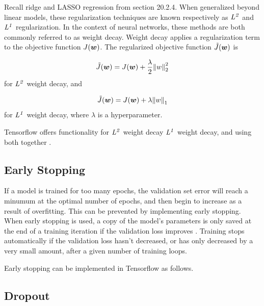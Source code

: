 \documentclass{article}
\begin{document}
Recall ridge and LASSO regression from section 20.2.4. When generalized beyond linear models, these regularization techniques are known respectively as \(\it{L}^2\) and \(\it{L}^1\) regularization. In the context of neural networks, these methods are both commonly referred to as weight decay. Weight decay applies a regularization term to the objective function \(J(\vb*{w})\). The regularized objective function \(\tilde{J}(\vb*{w})\) is 

\begin{equation}
    \tilde{J}(\vb*{w}) = J(\vb*{w}) +\frac{\lambda}{2}\norm{w}^2_2
    \label{L2-reg}
\end{equation} for \(\it{L}^2\) weight decay, and 

\begin{equation}
    \tilde{J}(\vb*{w}) = J(\vb*{w}) +\lambda\norm{w}_1
    \label{L1-reg}
\end{equation} for \(\it{L}^1\) weight decay, where \(\lambda\) is a hyperparameter.

Tensorflow offers functionality for \(\it{L}^2\) weight decay \(\it{L}^1\) weight decay, and using both together \cite{tensorflow2015-whitepaper}.



\subsection{Early Stopping} %

If a model is trained for too many epochs, the validation set error will reach a minumum at the optimal number of epochs, and then begin to increase as a result of overfitting. This can be prevented by implementing early stopping. When early stopping is used, a copy of the model's parameters is only saved at the end of a training iteration if the validation loss improves \cite{Goodfellow-et-al-2016}. Training stops automatically if the validation loss hasn't decreased, or has only decreased by a very small amount, after a given number of training loops.

Early stopping can be implemented in Tensorflow as follows.



\subsection{Dropout} %
\end{document}
